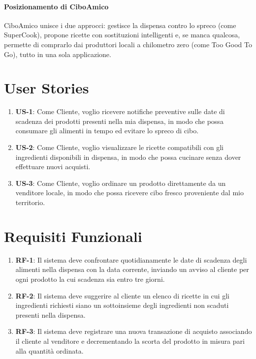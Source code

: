 \paragraph{Posizionamento di CiboAmico}
CiboAmico unisce i due approcci: gestisce la dispensa contro lo spreco (come SuperCook), propone ricette con sostituzioni intelligenti e, se manca qualcosa, permette di comprarlo dai produttori locali a chilometro zero (come Too Good To Go), tutto in una sola applicazione.

\section{User Stories}
\label{sec:user_stories}

\begin{enumerate}
    \item \textbf{US-1}: Come Cliente, voglio ricevere notifiche preventive sulle date di scadenza dei prodotti presenti nella mia dispensa, in modo che possa consumare gli alimenti in tempo ed evitare lo spreco di cibo.
    \item \textbf{US-2}: Come Cliente, voglio visualizzare le ricette compatibili con gli ingredienti disponibili in dispensa, in modo che possa cucinare senza dover effettuare nuovi acquisti.
    \item \textbf{US-3}: Come Cliente, voglio ordinare un prodotto direttamente da un venditore locale, in modo che possa ricevere cibo fresco proveniente dal mio territorio.
\end{enumerate}

\section{Requisiti Funzionali}
\label{sec:requisiti_funzionali}

\begin{enumerate}
    \item \textbf{RF-1}: Il sistema deve confrontare quotidianamente le date di scadenza degli alimenti nella dispensa con la data corrente, inviando un avviso al cliente per ogni prodotto la cui scadenza sia entro tre giorni.
    \item \textbf{RF-2}: Il sistema deve suggerire al cliente un elenco di ricette in cui gli ingredienti richiesti siano un sottoinsieme degli ingredienti non scaduti presenti nella dispensa.
    \item \textbf{RF-3}: Il sistema deve registrare una nuova transazione di acquisto associando il cliente al venditore e decrementando la scorta del prodotto in misura pari alla quantità ordinata.
\end{enumerate}

